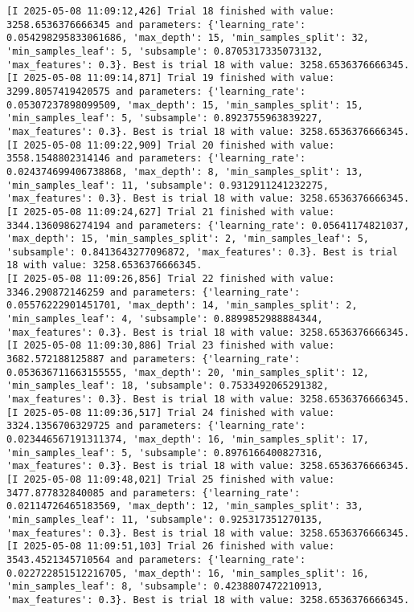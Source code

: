 \documentclass[
  letterpaper,
  DIV=11,
  numbers=noendperiod]{scrreprt}
\begin{document}
\begin{verbatim}
[I 2025-05-08 11:09:12,426] Trial 18 finished with value: 3258.6536376666345 and parameters: {'learning_rate': 0.054298295833061686, 'max_depth': 15, 'min_samples_split': 32, 'min_samples_leaf': 5, 'subsample': 0.8705317335073132, 'max_features': 0.3}. Best is trial 18 with value: 3258.6536376666345.
[I 2025-05-08 11:09:14,871] Trial 19 finished with value: 3299.8057419420575 and parameters: {'learning_rate': 0.05307237898099509, 'max_depth': 15, 'min_samples_split': 15, 'min_samples_leaf': 5, 'subsample': 0.8923755963839227, 'max_features': 0.3}. Best is trial 18 with value: 3258.6536376666345.
[I 2025-05-08 11:09:22,909] Trial 20 finished with value: 3558.1548802314146 and parameters: {'learning_rate': 0.024374699406738868, 'max_depth': 8, 'min_samples_split': 13, 'min_samples_leaf': 11, 'subsample': 0.9312911241232275, 'max_features': 0.3}. Best is trial 18 with value: 3258.6536376666345.
[I 2025-05-08 11:09:24,627] Trial 21 finished with value: 3344.1360986274194 and parameters: {'learning_rate': 0.05641174821037, 'max_depth': 15, 'min_samples_split': 2, 'min_samples_leaf': 5, 'subsample': 0.8413643277096872, 'max_features': 0.3}. Best is trial 18 with value: 3258.6536376666345.
[I 2025-05-08 11:09:26,856] Trial 22 finished with value: 3346.290872146259 and parameters: {'learning_rate': 0.05576222901451701, 'max_depth': 14, 'min_samples_split': 2, 'min_samples_leaf': 4, 'subsample': 0.8899852988884344, 'max_features': 0.3}. Best is trial 18 with value: 3258.6536376666345.
[I 2025-05-08 11:09:30,886] Trial 23 finished with value: 3682.572188125887 and parameters: {'learning_rate': 0.053636711663155555, 'max_depth': 20, 'min_samples_split': 12, 'min_samples_leaf': 18, 'subsample': 0.7533492065291382, 'max_features': 0.3}. Best is trial 18 with value: 3258.6536376666345.
[I 2025-05-08 11:09:36,517] Trial 24 finished with value: 3324.1356706329725 and parameters: {'learning_rate': 0.023446567191311374, 'max_depth': 16, 'min_samples_split': 17, 'min_samples_leaf': 5, 'subsample': 0.8976166400827316, 'max_features': 0.3}. Best is trial 18 with value: 3258.6536376666345.
[I 2025-05-08 11:09:48,021] Trial 25 finished with value: 3477.877832840085 and parameters: {'learning_rate': 0.02114726465183569, 'max_depth': 12, 'min_samples_split': 33, 'min_samples_leaf': 11, 'subsample': 0.925317351270135, 'max_features': 0.3}. Best is trial 18 with value: 3258.6536376666345.
[I 2025-05-08 11:09:51,103] Trial 26 finished with value: 3543.4521345710564 and parameters: {'learning_rate': 0.022722851512216705, 'max_depth': 16, 'min_samples_split': 16, 'min_samples_leaf': 8, 'subsample': 0.4238807472210913, 'max_features': 0.3}. Best is trial 18 with value: 3258.6536376666345.

\end{verbatim}
\end{document}

